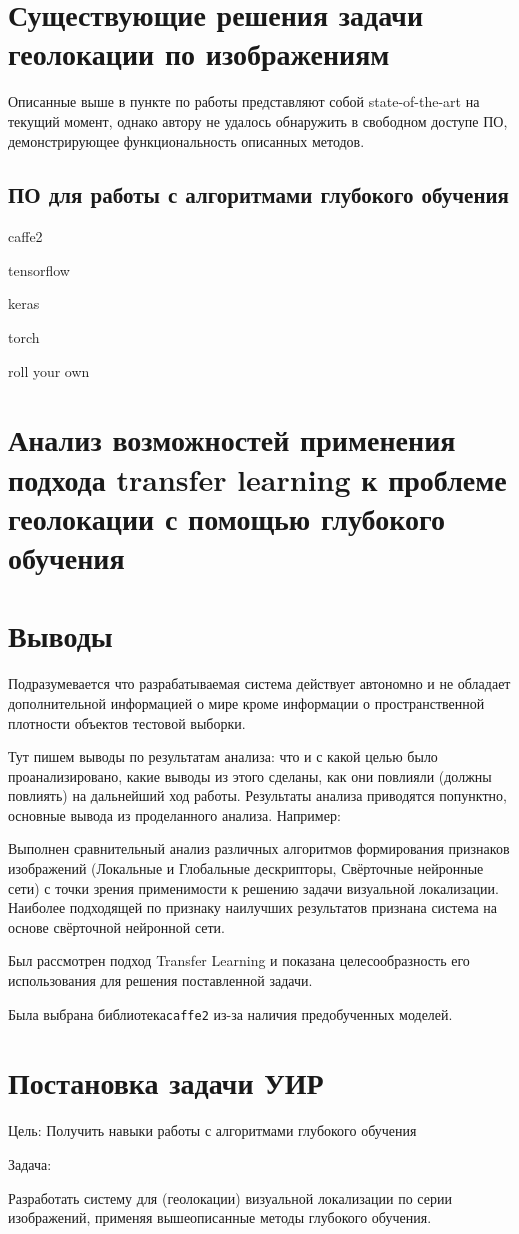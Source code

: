 \section{Существующие решения задачи геолокации по изображениям}

Описанные выше в пункте по работы \cite{weyand2016planet} представляют собой state-of-the-art на текущий момент, однако автору не удалось обнаружить в свободном доступе ПО, демонстрирующее функциональность описанных методов.

\subsection{ПО для работы с алгоритмами глубокого обучения}

caffe2

tensorflow

keras

torch

roll your own

\section{Анализ возможностей применения подхода transfer learning к проблеме геолокации с помощью глубокого обучения}



\section{Выводы}

Подразумевается что разрабатываемая система действует автономно и не обладает дополнительной информацией о мире кроме информации о пространственной плотности объектов тестовой выборки.

Тут пишем выводы по результатам анализа: что и с какой целью было проанализировано, какие выводы из этого сделаны, как они повлияли (должны повлиять) на дальнейший ход работы. Результаты анализа приводятся попунктно, основные вывода из проделанного анализа. Например:

\begin{compactenum}
	\item Выполнен сравнительный анализ различных алгоритмов формирования признаков изображений (Локальные и Глобальные дескрипторы, Свёрточные нейронные сети) с точки зрения применимости к решению задачи визуальной локализации. Наиболее подходящей по признаку наилучших результатов признана система на основе свёрточной нейронной сети.
	\item Был рассмотрен подход Transfer Learning и показана целесообразность его использования для решения поставленной задачи.
	\item Была выбрана библиотека\texttt{caffe2} из-за наличия предобученных моделей.
\end{compactenum}



\section{Постановка задачи УИР}

Цель:
Получить навыки работы с алгоритмами глубокого обучения

Задача:

Разработать систему для (геолокации) визуальной локализации по серии изображений, применяя вышеописанные методы глубокого обучения.

